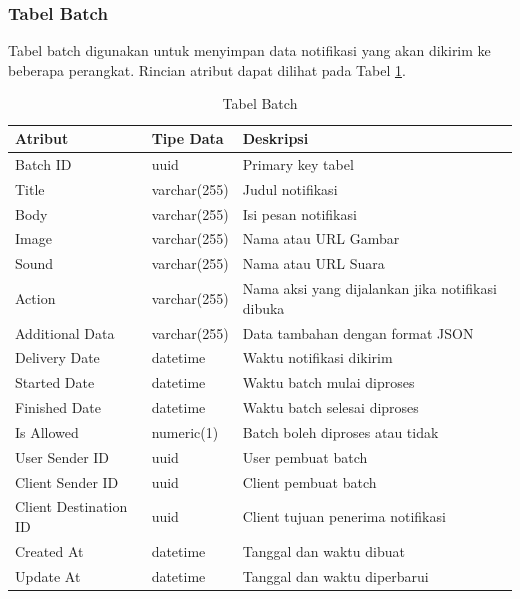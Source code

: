\subsubsection{Tabel Batch}
\par Tabel batch digunakan untuk menyimpan data notifikasi yang akan dikirim ke beberapa perangkat. Rincian atribut dapat dilihat pada Tabel \ref{tabel_batch}.
\begin{longtable}{|p{2cm}|p{2.5cm}|p{4.5cm}|}
	\caption{Tabel Batch} \label{tabel_batch} \\ \hline
    \textbf{Atribut} & \textbf{Tipe Data} & \textbf{Deskripsi} \\ \hline
    Batch ID & uuid & Primary key tabel \\ \hline
    Title & varchar(255) & Judul notifikasi \\ \hline
    Body & varchar(255) & Isi pesan notifikasi \\ \hline
    Image & varchar(255) & Nama atau URL Gambar \\ \hline
    Sound & varchar(255) & Nama atau URL Suara \\ \hline
    Action & varchar(255) & Nama aksi yang dijalankan jika notifikasi dibuka \\ \hline
    Additional Data & varchar(255) & Data tambahan dengan format JSON \\ \hline
    Delivery Date & datetime & Waktu notifikasi dikirim \\ \hline
    Started Date & datetime & Waktu batch mulai diproses \\ \hline
    Finished Date & datetime & Waktu batch selesai diproses \\ \hline
    Is Allowed & numeric(1) & Batch boleh diproses atau tidak \\ \hline
    User Sender ID & uuid & User pembuat batch \\ \hline
    Client Sender ID & uuid & Client pembuat batch \\ \hline
    Client Destination ID & uuid & Client tujuan penerima notifikasi \\ \hline
    Created At & datetime & Tanggal dan waktu dibuat \\ \hline
    Update At & datetime & Tanggal dan waktu diperbarui \\ \hline
\end{longtable}

